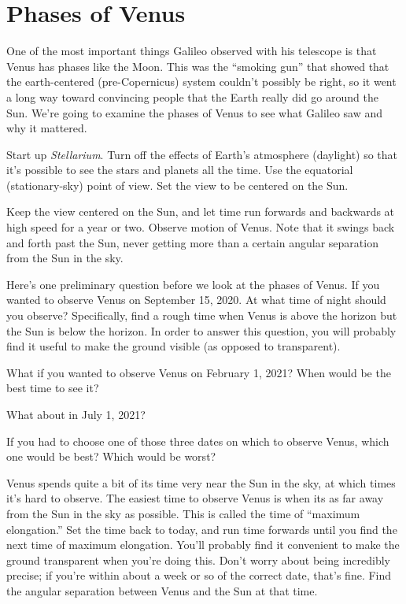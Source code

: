 \chapter{Phases of Venus}


One of the most important things Galileo observed with his telescope is that
Venus has phases like the Moon.   This was the ``smoking gun'' that showed
that the earth-centered (pre-Copernicus) system couldn't possibly be right,
so it went a long way toward convincing people that the Earth really did
go around the Sun.  We're going to examine the phases of Venus to see what
Galileo saw and why it mattered. 

Start up \textit{Stellarium}.
Turn off 
the effects of Earth's atmosphere (daylight)
so that it's possible to see the stars and planets all the time.
Use the equatorial (stationary-sky) point of view.
Set the view to be centered on the Sun.

Keep the view centered on the Sun, and let time run forwards and backwards 
at high speed for a year or two.
Observe
motion of Venus.  Note that it swings back and forth past the Sun,
never getting more than a certain angular separation from the Sun in the sky. 

Here's one preliminary question before we look at the phases of Venus.
If you wanted to observe Venus on September 15, 2020.
At what time of night should you
observe?  Specifically, find a rough time when Venus is above the
horizon but the Sun is below the horizon. In order to answer this
question, you will probably find it useful to make the ground visible (as
opposed to
transparent).



\vskip 0.7in

What if you wanted to observe Venus on February 1, 2021? When would be the
best time to see it?

\vskip 0.7in

What about in July 1, 2021?

\vskip 0.7in


If you had to choose one of those three dates on which to observe
Venus, which one would be best? Which would be worst?

\vskip 0.7in

Venus spends quite a bit of its time very near the Sun in the sky,
at which times it's hard to observe.
The easiest time to observe Venus is when its as far away from
the Sun in the sky as possible.  This is called the time of ``maximum
elongation.''  Set the time back to today, 
and run time forwards until you find the next time of maximum
elongation. You'll probably find it convenient to make the ground transparent
when you're doing this.
Don't worry about being incredibly precise; if you're
within about a week or so of the correct date, that's fine.
Find the angular
separation between
Venus and the Sun at that time. 

